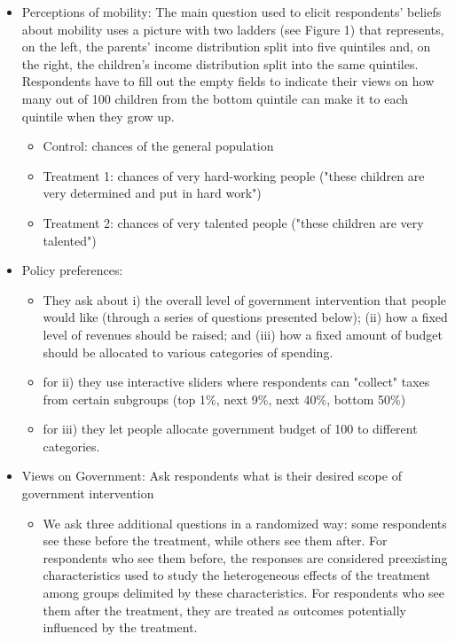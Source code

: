 \documentclass[a4paper, 12pt]{article}
\begin{document}
\begin{itemize}
\begin{itemize}
        \item Perceptions of mobility: The main question used to elicit respondents’ beliefs about mobility uses a picture with two ladders (see Figure 1) that represents, on the left, the parents’ income distribution split into five quintiles and, on the right, the children’s income distribution split into the same quintiles. Respondents have to fill out the empty fields to indicate their views on how many out of 100 children from the bottom quintile can make it to each quintile when they grow up.
        \begin{itemize}
            \item Control: chances of the general population
            \item Treatment 1: chances of very hard-working people ("these children are very determined and put in hard work")
            \item Treatment 2: chances of very talented people ("these children are very talented")
        \end{itemize}
        \item Policy preferences: 
        \begin{itemize}
            \item They ask about i) the overall level of government intervention that people would like (through a series of questions presented below); (ii) how a fixed level of revenues should be raised; and (iii) how a fixed amount of budget should be allocated to various categories of spending.
            \item for ii) they use interactive sliders where respondents can "collect" taxes from certain subgroups (top 1\%, next 9\%, next 40\%, bottom 50\%)
            \item for iii) they let people allocate government budget of 100 to different categories. 
        \end{itemize}
        \item Views on Government: Ask respondents what is their desired scope of government intervention
        \begin{itemize}
            \item We ask three additional questions in a randomized way: some respondents see these before the treatment, while others see them after. For respondents who see them before, the responses are considered preexisting characteristics used to study the heterogeneous effects of the treatment among groups delimited by these characteristics. For respondents who see them after the treatment, they are treated as outcomes potentially influenced by the treatment.

\end{itemize}
\end{itemize}
\end{itemize}
\end{document}
